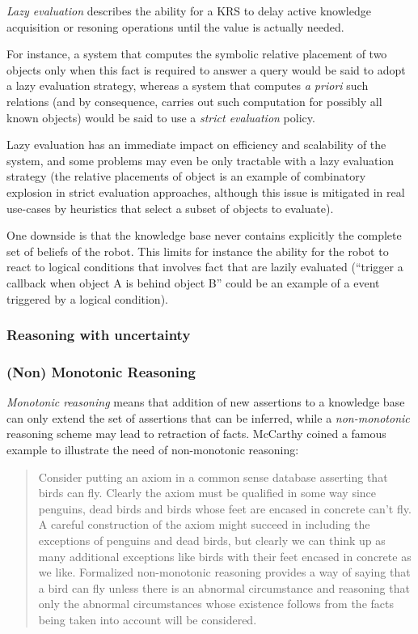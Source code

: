 \emph{Lazy evaluation} describes the ability for a KRS to delay active
knowledge acquisition or resoning operations until the value is actually
needed.

For instance, a system that computes the symbolic relative placement of two
objects only when this fact is required to answer a query would be said to
adopt a lazy evaluation strategy, whereas a system that computes {\it a priori}
such relations (and by consequence, carries out such computation for possibly
all known objects) would be said to use a \emph{strict evaluation} policy.

Lazy evaluation has an immediate impact on efficiency and scalability of the
system, and some problems may even be only tractable with a lazy evaluation
strategy (the relative placements of object is an example of combinatory
explosion in strict evaluation approaches, although this issue is mitigated in
real use-cases by heuristics that select a subset of objects to evaluate).

One downside is that the knowledge base never contains explicitly the complete
set of beliefs of the robot. This limits for instance the ability for the robot
to react to logical conditions that involves fact that are lazily evaluated
(``trigger a callback when object A is behind object B'' could be an example of
a event triggered by a logical condition).

\subsubsection{Reasoning with uncertainty}


\subsubsection{(Non) Monotonic Reasoning}

\emph{Monotonic reasoning} means that addition of new assertions to a knowledge base
can only extend the set of assertions that can be inferred, while a
\emph{non-monotonic} reasoning scheme may lead to retraction of facts.
McCarthy coined a famous example to illustrate the need of non-monotonic reasoning:

\begin{quotation}
Consider putting an axiom in a common sense database asserting that birds can
fly. Clearly the axiom must be qualified in some way since penguins, dead birds
and birds whose feet are encased in concrete can't fly. A careful construction
of the axiom might succeed in including the exceptions of penguins and dead
birds, but clearly we can think up as many additional exceptions like birds
with their feet encased in concrete as we like. Formalized non-monotonic
reasoning provides a way of saying that a bird can fly unless there
is an abnormal circumstance and reasoning that only the abnormal circumstances
whose existence follows from the facts being taken into account will be
considered.
\end{quotation}

